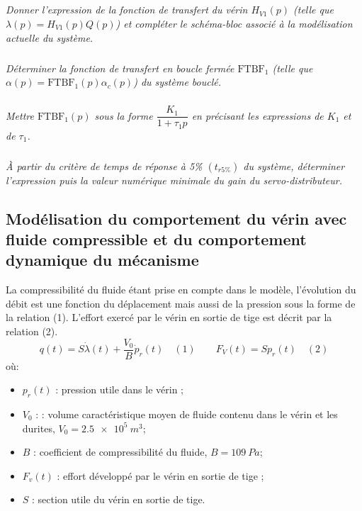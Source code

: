 \documentclass[10pt,fleqn]{article} %
\begin{document}
\begin{multicols}{2}
\subparagraph{}\textit{Donner l'expression de la fonction de transfert du vérin $H_{V1}(p)$ (telle que $\lambda(p) = H_{V1}(p) Q(p)$) et compléter le schéma-bloc associé à la modélisation actuelle du système.}
\ifprof
\begin{corrige}
\end{corrige}
\else
\fi

\subparagraph{}\textit{Déterminer la fonction de transfert en boucle fermée $\text{FTBF}_1$ (telle que $\alpha(p) = \text{FTBF}_1(p) \alpha_c(p)$) du système bouclé. } 
 \ifprof
\begin{corrige}
\end{corrige}
\else
\fi



\subparagraph{}\textit{Mettre  $\text{FTBF}_1(p)$ sous la forme 
$\dfrac{K_1}{1+\tau_1 p}$ en précisant les expressions de $K_1$ et de $\tau_1$.}
\ifprof
\begin{corrige}
\end{corrige}
\else
\fi

\subparagraph{}\textit{ À partir du critère de temps de réponse à 5\% $(t_{r5\%})$ du système, déterminer l'expression puis la valeur numérique minimale du gain du servo-distributeur.} 

\ifprof
\begin{corrige}
\end{corrige}
\else
\fi

\subsection*{Modélisation du comportement du vérin avec fluide compressible et du comportement dynamique du mécanisme}

La compressibilité du fluide étant prise en compte dans le modèle, l'évolution du débit est une fonction du déplacement mais aussi de la pression sous la forme de la relation (1). L'effort exercé par le vérin en sortie de tige est décrit par la relation (2).
$$
q(t)=S\dot{\lambda}(t)+\dfrac{V_0}{B}\dot{p}_r(t) \quad (1) \quad\quad
F_V(t)=Sp_r(t) \quad (2)
$$
où:
\begin{itemize}
\item $p_r(t)$ : pression utile dans le vérin ;
\item $V_0$ : : volume caractéristique moyen de fluide contenu dans le vérin et les durites, $V_0 = \SI{2,5e5}{m^3}$;
\item $B$ : coefficient de compressibilité du fluide, $B = \SI{109}{Pa}$;
\item $F_v(t)$ : effort développé par le vérin en sortie de tige ;
\item $S$ : section utile du vérin en sortie de tige.
\end{itemize}


\end{multicols}
\end{document}
